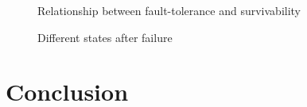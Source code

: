 \documentclass[onecolumn,conference]{IEEEtran}
\begin{document}
    \begin{figure}[htbp]
        \centering
        \caption{Relationship between fault-tolerance and survivability}
        \label{fig:3}
    \end{figure}



    \begin{figure}[htbp]
        \centering
        \caption{Different states after failure}
        \label{fig:4}
    \end{figure}



    \section{Conclusion} \label{sec:conc}
\end{document}
